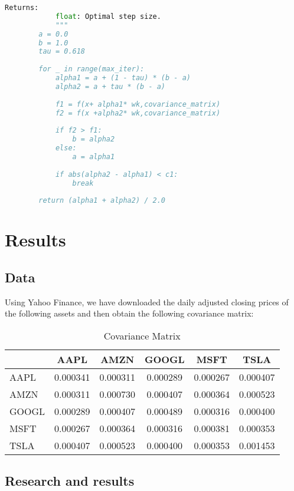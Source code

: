 \documentclass[12pt]{article}
\begin{document}
\begin{lstlisting}[language=Python]
            Returns:
            float: Optimal step size.
            """
        a = 0.0
        b = 1.0
        tau = 0.618
    
        for _ in range(max_iter):
            alpha1 = a + (1 - tau) * (b - a)
            alpha2 = a + tau * (b - a)
    
            f1 = f(x+ alpha1* wk,covariance_matrix)
            f2 = f(x +alpha2* wk,covariance_matrix)
    
            if f2 > f1:
                b = alpha2
            else:
                a = alpha1
    
            if abs(alpha2 - alpha1) < c1:
                break
    
        return (alpha1 + alpha2) / 2.0

\end{lstlisting}

\section*{Results}

\subsection*{Data}

Using Yahoo Finance, we have downloaded the daily adjusted closing prices of the following assets and then obtain the following covariance matrix:

\begin{table}[h]
    \centering
    \begin{tabular}{l|ccccc}
          & AAPL   & AMZN   & GOOGL  & MSFT   & TSLA   \\
    \hline
    AAPL  & 0.000341 & 0.000311 & 0.000289 & 0.000267 & 0.000407 \\
    AMZN  & 0.000311 & 0.000730 & 0.000407 & 0.000364 & 0.000523 \\
    GOOGL & 0.000289 & 0.000407 & 0.000489 & 0.000316 & 0.000400 \\
    MSFT  & 0.000267 & 0.000364 & 0.000316 & 0.000381 & 0.000353 \\
    TSLA  & 0.000407 & 0.000523 & 0.000400 & 0.000353 & 0.001453 \\
    \end{tabular}
    \caption{Covariance Matrix}
    \label{tab:covariance_matrix}
\end{table}


\subsection*{Research and results}
\end{document}
